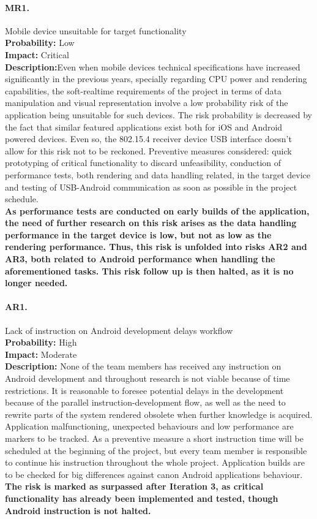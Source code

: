 		\paragraph{MR1.}Mobile device unsuitable for target functionality\\
		\textbf{Probability:} Low\\
		\textbf{Impact:} Critical\\
		\textbf{Description:}Even when mobile devices technical specifications have increased significantly in the previous years, specially regarding CPU power and rendering capabilities, the soft-realtime requirements of the project in terms of data manipulation and visual representation involve a low probability risk of the application being unsuitable for such devices. The risk probability is decreased by the fact that similar featured applications exist both for iOS and Android powered devices. Even so, the 802.15.4 receiver device USB interface doesn't allow for this risk not to be reckoned.
		Preventive measures considered: quick prototyping of critical functionality to discard  unfeasibility, conduction of performance tests, both rendering and data handling related, in the target device and testing of USB-Android communication as soon as possible in the project schedule.\\
		\textbf{As performance tests are conducted on early builds of the application, the need of further research on this risk arises as the data handling performance in the target device is low, but not as low as the rendering performance. Thus, this risk is unfolded into risks AR2 and AR3, both related to Android performance when handling the aforementioned tasks. This risk follow up is then halted, as it is no longer needed.}

		\paragraph{AR1.}Lack of instruction on Android development delays workflow\\
		\textbf{Probability:} High\\
		\textbf{Impact:} Moderate\\
		\textbf{Description:} None of the team members has received any instruction on Android development and throughout research is not viable because of time restrictions. It is reasonable to foresee potential delays in the development because of the parallel instruction-development flow, as well as the need to rewrite parts of the system rendered obsolete when further knowledge is acquired.
		Application malfunctioning, unexpected behaviours and low performance are markers to be tracked.
		As a preventive measure a short instruction time will be scheduled at the beginning of the project, but every team member is responsible to continue his instruction throughout the whole project. Application builds are to be checked for big differences against canon Android applications behaviour.\\
		\textbf{The risk is marked as surpassed after Iteration 3, as critical functionality has already been implemented and tested, though Android instruction is not halted.}

